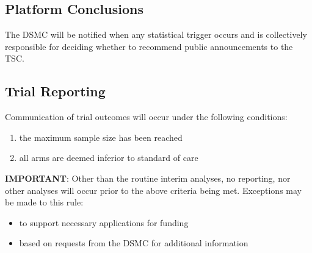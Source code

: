 \documentclass[
]{article}
\providecommand{\tightlist}{%
  \setlength{\itemsep}{0pt}\setlength{\parskip}{0pt}}
\begin{document}
\hypertarget{platform-conclusions}{%
  \subsection{Platform Conclusions}\label{platform-conclusions}}

The DSMC will be notified when any statistical trigger occurs and is collectively responsible for deciding whether to recommend public announcements to the TSC.

\hypertarget{trial-reporting}{%
  \subsection{Trial Reporting}\label{trial-reporting}}

Communication of trial outcomes will occur under the following conditions:

\begin{enumerate}
  \def\labelenumi{\arabic{enumi}.}
  \tightlist
  \item
        the maximum sample size has been reached
  \item
        all arms are deemed inferior to standard of care
\end{enumerate}

\textbf{IMPORTANT}: Other than the routine interim analyses, no reporting, nor other analyses will occur prior to the above criteria being met.
Exceptions may be made to this rule:

\begin{itemize}
  \tightlist
  \item to support necessary applications for funding
  \item based on requests from the DSMC for additional information
\end{itemize}

\clearpage

\printbibliography[heading=bibintoc]
\end{document}
